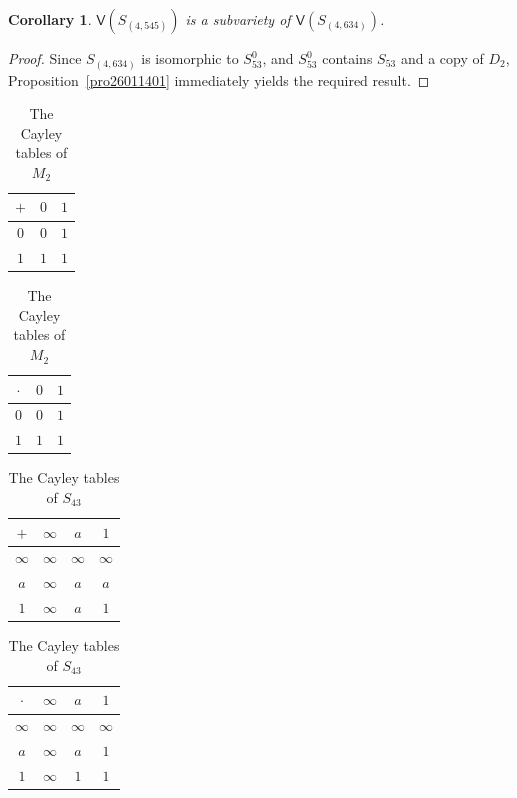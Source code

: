 \documentclass[reqno]{amsart}
\theoremstyle{plain}
\newtheorem{cor}[thm]{Corollary}
\theoremstyle{definition}
\begin{document}
\begin{cor}\label{coro26012301}
$\mathsf{V}(S_{(4, 545)})$ is a subvariety of $\mathsf{V}(S_{(4, 634)})$.
\end{cor}
\begin{proof}
Since $S_{(4, 634)}$ is isomorphic to $S^0_{53}$, and $S^0_{53}$ contains $S_{53}$ and a copy of $D_2$,
Proposition~\ref{pro26011401} immediately yields the required result.
\end{proof}

\begin{table}[ht]
\caption{The Cayley tables of $M_2$} \label{tbM_2}
\begin{tabular}{c|cc}
$+$      &$0$&$1$\\
\hline
$0$      &$0$&$1$\\
$1$      &$1$&$1$\\
\end{tabular}\qquad
\begin{tabular}{c|cc}
$\cdot$      &$0$&$1$\\
\hline
$0$      &$0$&$1$\\
$1$      &$1$&$1$\\
\end{tabular}
\end{table}

\begin{table}[ht]
\caption{The Cayley tables of $S_{43}$} \label{tb43}
\begin{tabular}{c|ccc}
$+$      &$\infty$&$a$&$1$\\
\hline
$\infty$ &$\infty$&$\infty$&$\infty$\\
$a$      &$\infty$&$a$&$a$\\
$1$      &$\infty$&$a$&$1$\\
\end{tabular}\qquad
\begin{tabular}{c|ccc}
$\cdot$  &$\infty$&$a$&$1$\\
\hline
$\infty$ &$\infty$&$\infty$&$\infty$\\
$a$      &$\infty$&$a$&$1$\\
$1$      &$\infty$&$1$&$1$\\
\end{tabular}
\end{table}
\end{document}
